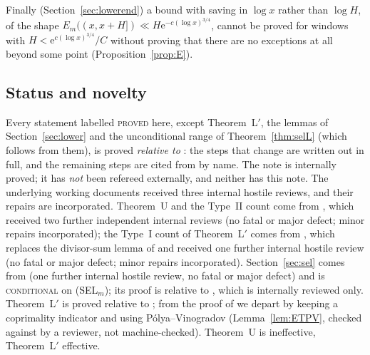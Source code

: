 \documentclass[10pt,reqno]{amsart}
\theoremstyle{definition}
\newcommand{\e}{\mathrm e}
\newcommand{\status}[1]{\textup{\textsc{#1}}}
\begin{document}
Finally (Section~\ref{sec:lowerend}) a bound with saving in $\log x$
rather than $\log H$, of the shape
$E_m((x,x+H])\ll H\e^{-c(\log x)^{3/4}}$, cannot be proved for windows
with $H<\e^{c(\log x)^{3/4}}/C$ without proving that there are no
exceptions at all beyond some point (Proposition~\ref{prop:E}).

\subsection*{Status and novelty}
Every statement labelled \status{proved} here, except Theorem~L$'$,
the lemmas of Section~\ref{sec:lower} and the unconditional range of
Theorem~\ref{thm:selL} (which follows from them), is proved \emph{relative to}
\cite{TQ}: the steps that change are written out in full, and the
remaining steps are cited from \cite{TQ} by name.  The note \cite{TQ}
is internally proved; it has \emph{not} been refereed externally, and
neither has this note.  The underlying working documents
\cite{SHORT,MN} received three internal hostile reviews, and their
repairs are incorporated.  Theorem~U and the Type~II count come from \cite{MN2}, which
received two further independent internal reviews (no fatal or major
defect; minor repairs incorporated); the Type~I count of Theorem~L$'$ comes from \cite{MN3},
which replaces the divisor-sum lemma of \cite{MN2} and received one
further internal hostile review (no fatal or major defect; minor repairs
incorporated).  Section~\ref{sec:sel} comes from \cite{MN4} (one further
internal hostile review, no fatal or major defect) and is \status{conditional}
on (SEL$_m$); its proof is relative to \cite{HN}, which is internally
reviewed only.  Theorem~L$'$ is proved relative to
\cite[Thm.~7.1]{ET}; from the proof of \cite[Prop.~1.4]{ET} we
depart by keeping a coprimality indicator and using P\'olya--Vinogradov
(Lemma~\ref{lem:ETPV}, checked against \cite[pp.~25--32]{ET} by a
reviewer, not machine-checked).  Theorem~U is ineffective, Theorem~L$'$
effective.
\end{document}

